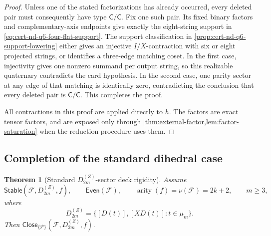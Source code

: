 \documentclass[11pt,letterpaper,onecolumn]{article}
\theoremstyle{plain}
\newtheorem{theorem}{Theorem}[section]
\theoremstyle{definition}
\theoremstyle{remark}
\newcommand{\cF}{\mathcal F}
\newcommand{\cP}{\mathscr P}
\newcommand{\DihZ}[1]{{D_{#1}^{(Z)}}}
\newcommand{\Stable}{\mathsf{Stable}}
\newcommand{\Even}{\mathsf{Even}}
\newcommand{\Close}{\mathsf{Close}}
\newcommand{\arity}{\operatorname{arity}}
\begin{document}
\begin{proof}
Unless one of the stated factorizations has already occurred, every
deleted pair must consequently have type \(\mathsf{C}/\mathsf{C}\).  Fix one such pair.
Its fixed binary factors and complementary-axis endpoints give exactly
the eight-string support in
\cref{eq:cert-nd-q6-four-flat-support}.  The support classification in
\cref{prop:cert-nd-q6-support-lowering} either gives an injective
\(I/X\)-contraction with six or eight projected strings, or identifies
a three-edge matching coset.  In the first case, injectivity gives one
nonzero summand per output string, so this realizable quaternary contradicts
the card hypothesis.  In the second case, one parity sector at any
edge of that matching is identically zero, contradicting the conclusion
that every deleted pair is \(\mathsf{C}/\mathsf{C}\).  This completes the proof.

All contractions in this proof are applied directly to \(h\).
The factors are exact tensor factors, and are exposed only through
\cref{thm:external-factor,lem:factor-saturation} when the reduction
procedure uses them.
\end{proof}

\subsection{Completion of the standard dihedral case}

\begin{theorem}[Standard \(\DihZ{2m}\)-sector deck rigidity]
\label{thm:normalized-dihedral}
Assume
\[
 \Stable(\cF,\DihZ{2m},f),\qquad \Even(\cF),\qquad
 \arity(f)=\nu(\cF)=2k+2,\qquad m\ge3,
\]
where
\[
 \DihZ{2m}
 =\{[D(t)],[XD(t)]:t\in\mu_m\}.
\]
Then \(\Close_{\{\cP\}}(\cF,\DihZ{2m},f)\).
\end{theorem}
\end{document}
